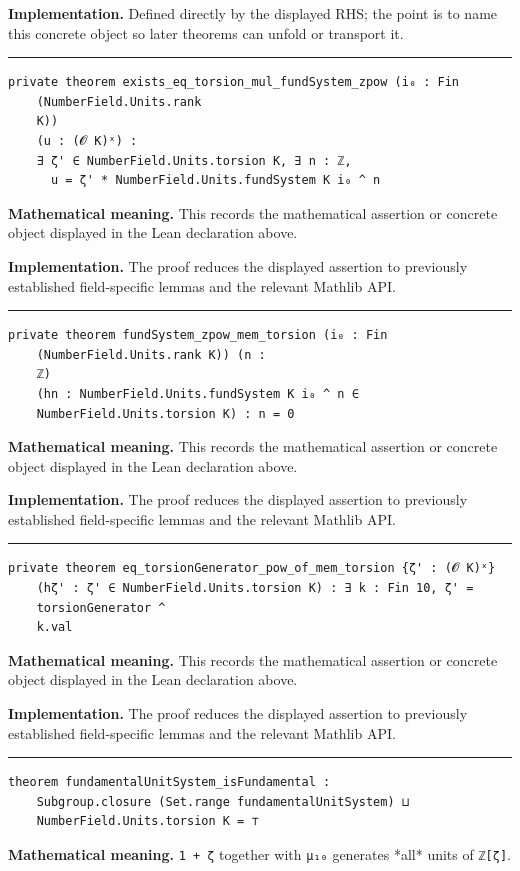 \documentclass[UTF8,a4paper,11pt,fontset=fandol]{ctexart}
\theoremstyle{definition}
\newcommand{\statementsep}{\par\medskip\hrule\medskip}
\begin{document}
\noindent\textbf{Implementation.} Defined directly by the displayed RHS; the point is to name this concrete object so later theorems can unfold or transport it.\par
\statementsep
\begin{verbatim}
private theorem exists_eq_torsion_mul_fundSystem_zpow (i₀ : Fin
    (NumberField.Units.rank
    K))
    (u : (𝓞 K)ˣ) :
    ∃ ζ' ∈ NumberField.Units.torsion K, ∃ n : ℤ,
      u = ζ' * NumberField.Units.fundSystem K i₀ ^ n
\end{verbatim}
\noindent\textbf{Mathematical meaning.} This records the mathematical assertion or concrete object displayed in the Lean declaration above.\par
\noindent\textbf{Implementation.} The proof reduces the displayed assertion to previously established field-specific lemmas and the relevant Mathlib API.\par
\statementsep
\begin{verbatim}
private theorem fundSystem_zpow_mem_torsion (i₀ : Fin
    (NumberField.Units.rank K)) (n :
    ℤ)
    (hn : NumberField.Units.fundSystem K i₀ ^ n ∈
    NumberField.Units.torsion K) : n = 0
\end{verbatim}
\noindent\textbf{Mathematical meaning.} This records the mathematical assertion or concrete object displayed in the Lean declaration above.\par
\noindent\textbf{Implementation.} The proof reduces the displayed assertion to previously established field-specific lemmas and the relevant Mathlib API.\par
\statementsep
\begin{verbatim}
private theorem eq_torsionGenerator_pow_of_mem_torsion {ζ' : (𝓞 K)ˣ}
    (hζ' : ζ' ∈ NumberField.Units.torsion K) : ∃ k : Fin 10, ζ' =
    torsionGenerator ^
    k.val
\end{verbatim}
\noindent\textbf{Mathematical meaning.} This records the mathematical assertion or concrete object displayed in the Lean declaration above.\par
\noindent\textbf{Implementation.} The proof reduces the displayed assertion to previously established field-specific lemmas and the relevant Mathlib API.\par
\statementsep
\begin{verbatim}
theorem fundamentalUnitSystem_isFundamental :
    Subgroup.closure (Set.range fundamentalUnitSystem) ⊔
    NumberField.Units.torsion K = ⊤
\end{verbatim}
\noindent\textbf{Mathematical meaning.} \texttt{1 + ζ} together with \texttt{μ₁₀} generates *all* units of \texttt{ℤ[ζ]}.\par
\end{document}
